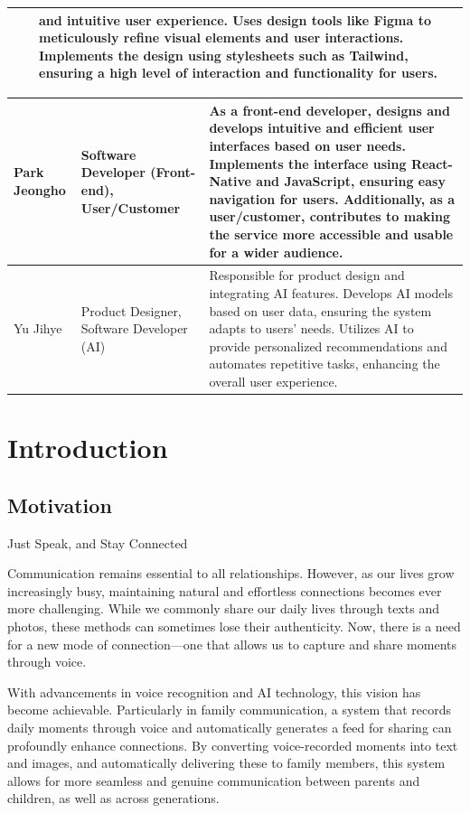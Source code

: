 \documentclass[conference]{IEEEtran}
\begin{document}
\begin{table}[htbp]
\begin{tabular}{|p{1cm}|p{1.7cm}|p{5cm}|}
    \hline
    & & and intuitive user experience. Uses design tools like Figma to meticulously refine visual elements and user interactions. Implements the design using stylesheets such as Tailwind, ensuring a high level of interaction and functionality for users.\\
    \hline
\end{tabular}

 \begin{tabular}{|p{1cm}|p{1.7cm}|p{5cm}|}
    Park Jeongho & Software Developer (Front-end), User/Customer & As a front-end developer, designs and develops intuitive and efficient user interfaces based on user needs. Implements the interface using React-Native and JavaScript, ensuring easy navigation for users. Additionally, as a user/customer, contributes to making the service more accessible and usable for a wider audience.\\
    \hline
    Yu Jihye & Product Designer, Software Developer (AI) & Responsible for product design and integrating AI features. Develops AI models based on user data, ensuring the system adapts to users' needs. Utilizes AI to provide personalized recommendations and automates repetitive tasks, enhancing the overall user experience.\\
    \hline
\end{tabular}
\end{table}

\section{Introduction}
    \subsection{Motivation}
    Just Speak, and Stay Connected

    Communication remains essential to all relationships. However, as our lives grow increasingly busy, maintaining natural and effortless connections becomes ever more challenging. While we commonly share our daily lives through texts and photos, these methods can sometimes lose their authenticity. Now, there is a need for a new mode of connection—one that allows us to capture and share moments through voice.

    With advancements in voice recognition and AI technology, this vision has become achievable. Particularly in family communication, a system that records daily moments through voice and automatically generates a feed for sharing can profoundly enhance connections. By converting voice-recorded moments into text and images, and automatically delivering these to family members, this system allows for more seamless and genuine communication between parents and children, as well as across generations.
\end{document}
